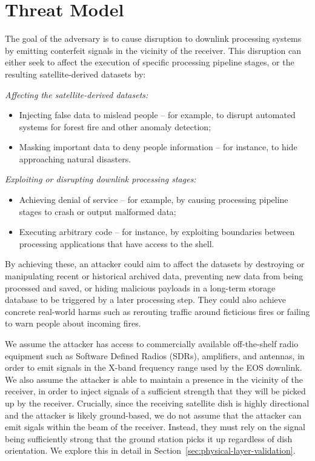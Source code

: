 \section{Threat Model}\label{sec:threat-model}

The goal of the adversary is to cause disruption to downlink processing systems by emitting conterfeit signals in the vicinity of the receiver.
This disruption can either seek to affect the execution of specific processing pipeline stages, or the resulting satellite-derived datasets by:


\noindent\textit{Affecting the satellite-derived datasets:}
\begin{itemize}
    \item Injecting false data to mislead people -- for example, to disrupt automated systems for forest fire and other anomaly detection;
    \item Masking important data to deny people information -- for instance, to hide approaching natural disasters.
\end{itemize}

\noindent\textit{Exploiting or disrupting downlink processing stages:}
\begin{itemize}
    \item Achieving denial of service -- for example, by causing processing pipeline stages to crash or output malformed data;
    \item Executing arbitrary code -- for instance, by exploiting boundaries between processing applications that have access to the shell.
\end{itemize}

By achieving these, an attacker could aim to affect the datasets by destroying or manipulating recent or historical archived data, preventing new data from being processed and saved, or hiding malicious payloads in a long-term storage database to be triggered by a later processing step.
They could also achieve concrete real-world harms such as rerouting traffic around ficticious fires or failing to warn people about incoming fires.

We assume the attacker has access to commercially available off-the-shelf radio equipment such as Software Defined Radios (SDRs), amplifiers, and antennas, in order to emit signals in the X-band frequency range used by the EOS downlink.
We also assume the attacker is able to maintain a presence in the vicinity of the receiver, in order to inject signals of a sufficient strength that they will be picked up by the receiver.
Crucially, since the receiving satellite dish is highly directional and the attacker is likely ground-based, we do not assume that the attacker can emit sigals within the beam of the receiver.
Instead, they must rely on the signal being sufficiently strong that the ground station picks it up regardless of dish orientation.
We explore this in detail in Section~\ref{sec:physical-layer-validation}.

